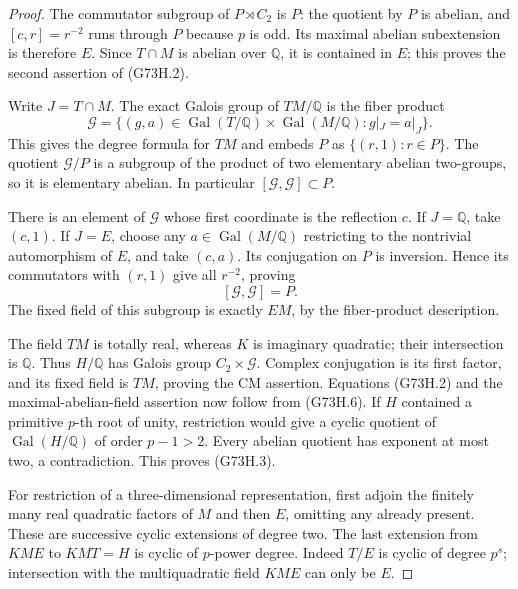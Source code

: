 \begin{proof}
The commutator subgroup of \(P\rtimes C_2\) is \(P\):
the quotient by \(P\) is abelian, and
\([c,r]=r^{-2}\) runs through \(P\) because \(p\) is odd.
Its maximal abelian subextension is therefore \(E\).
Since \(T\cap M\) is abelian over \(\mathbb Q\), it is contained
in \(E\); this proves the second assertion of (G73H.2).

Write \(J=T\cap M\).  The exact Galois group of \(TM/\mathbb Q\) is
the fiber product
\[
 \mathcal G=
 \{(g,a)\in\operatorname{Gal}(T/\mathbb Q)
                 \times\operatorname{Gal}(M/\mathbb Q):
                      g|_J=a|_J\}.
 \tag{G73H.5}
\]
This gives the degree formula for \(TM\) and embeds \(P\) as
\(\{(r,1):r\in P\}\).  The quotient \(\mathcal G/P\) is a
subgroup of the product of two elementary abelian two-groups,
so it is elementary abelian.  In particular
\([\mathcal G,\mathcal G]\subset P\).

There is an element of \(\mathcal G\) whose first coordinate is
the reflection \(c\).  If \(J=\mathbb Q\), take \((c,1)\).
If \(J=E\), choose any \(a\in\operatorname{Gal}(M/\mathbb Q)\)
restricting to the nontrivial automorphism of \(E\), and take
\((c,a)\).  Its conjugation on \(P\) is inversion.  Hence its
commutators with \((r,1)\) give all \(r^{-2}\), proving
\[
                         [\mathcal G,\mathcal G]=P.
 \tag{G73H.6}
\]
The fixed field of this subgroup is exactly \(EM\), by the
fiber-product description.

The field \(TM\) is totally real, whereas \(K\) is imaginary
quadratic; their intersection is \(\mathbb Q\).
Thus \(H/\mathbb Q\) has Galois group
\(C_2\times\mathcal G\).  Complex conjugation is its first
factor, and its fixed field is \(TM\), proving the CM assertion.
Equations (G73H.2) and the maximal-abelian-field assertion now
follow from (G73H.6).
If \(H\) contained a primitive \(p\)-th root of unity, restriction
would give a cyclic quotient of \(\operatorname{Gal}(H/\mathbb Q)\)
of order \(p-1>2\).  Every abelian quotient has exponent at most
two, a contradiction.  This proves (G73H.3).

For restriction of a three-dimensional representation, first
adjoin the finitely many real quadratic factors of \(M\) and
then \(E\), omitting any already present.  These are successive
cyclic extensions of degree two.  The last extension from
\(KME\) to \(KMT=H\) is cyclic of \(p\)-power degree.
Indeed \(T/E\) is cyclic of degree \(p^s\); intersection with
the multiquadratic field \(KME\) can only be \(E\).


\end{proof}

